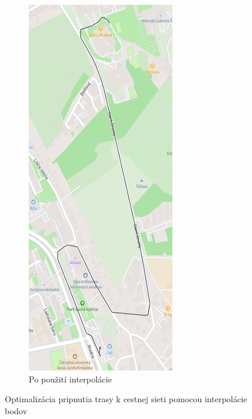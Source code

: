 \begin{figure}[H]
\begin{subfigure}{0.4\textwidth}
        \includegraphics[width=.5\textwidth]{img/interpolacia bodov/after.png}
        \caption{Po použití interpolácie}
        \label{fig:after-interpolation}
    \end{subfigure}
    \caption{Optimalizácia pripnutia trasy k cestnej sieti pomocou interpolácie bodov}
\end{figure}